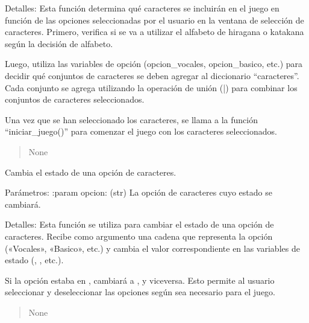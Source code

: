 \documentclass[letterpaper,10pt,spanish]{sphinxmanual}
\begin{document}
\begin{fulllineitems}
\begin{fulllineitems}
\sphinxAtStartPar
Detalles: Esta función determina qué caracteres se incluirán en el juego en función de las opciones
seleccionadas por el usuario en la ventana de selección de caracteres. Primero, verifica si se va a utilizar
el alfabeto de hiragana o katakana según la decisión de alfabeto.

\sphinxAtStartPar
Luego, utiliza las variables de opción (opcion\_vocales, opcion\_basico, etc.) para decidir qué conjuntos de
caracteres se deben agregar al diccionario “caracteres”. Cada conjunto se agrega utilizando la operación de
unión (|) para combinar los conjuntos de caracteres seleccionados.

\sphinxAtStartPar
Una vez que se han seleccionado los caracteres, se llama a la función “iniciar\_juego()” para comenzar el
juego con los caracteres seleccionados.
\begin{quote}\begin{description}
\sphinxAtStartPar
None

\end{description}\end{quote}

\end{fulllineitems}


\begin{fulllineitems}
\label{\detokenize{menu_juego:menu_juego.CaracteresSelector.toggle_opcion}}
\pysigstartsignatures
{}
\pysigstopsignatures
\sphinxAtStartPar
Cambia el estado de una opción de caracteres.

\sphinxAtStartPar
Parámetros:
:param opcion: (str) La opción de caracteres cuyo estado se cambiará.

\sphinxAtStartPar
Detalles:
Esta función se utiliza para cambiar el estado de una opción de caracteres. Recibe como argumento una cadena que
representa la opción («Vocales», «Basico», etc.) y cambia el valor correspondiente en las variables de estado
(, , etc.).

\sphinxAtStartPar
Si la opción estaba en , cambiará a , y viceversa. Esto permite al usuario seleccionar y
deseleccionar las opciones según sea necesario para el juego.
\begin{quote}\begin{description}
\sphinxAtStartPar
None

\end{description}\end{quote}

\end{fulllineitems}


\end{fulllineitems}
\end{document}
